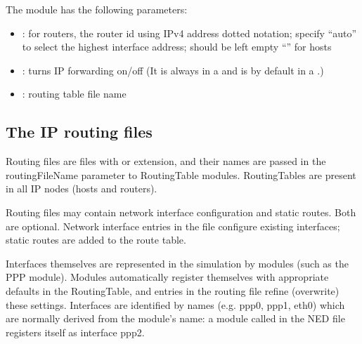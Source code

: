 The  module has the following parameters:

\begin{itemize}
  \item {}: for routers, the router id using IPv4 address dotted notation;
        specify ``auto'' to select the highest interface address; should be left empty ``''
        for hosts
  \item {}: turns IP forwarding on/off (It is always 
                          in a  and is  by default
                          in a .)
  \item {}: routing table file name
\end{itemize}


\subsection{The IP routing files}

Routing files are files with  or  extension,
and their names are passed in the routingFileName parameter
to RoutingTable modules. RoutingTables are present in all
IP nodes (hosts and routers).

Routing files may contain network interface configuration and static
routes. Both are optional. Network interface entries in the file
configure existing interfaces; static routes are added to the route table.

Interfaces themselves are represented in the simulation by modules
(such as the PPP module). Modules automatically register themselves
with appropriate defaults in the RoutingTable, and entries in the
routing file refine (overwrite) these settings.
Interfaces are identified by names (e.g. ppp0, ppp1, eth0) which
are normally derived from the module's name: a module called
 in the NED file registers itself as interface ppp2.

